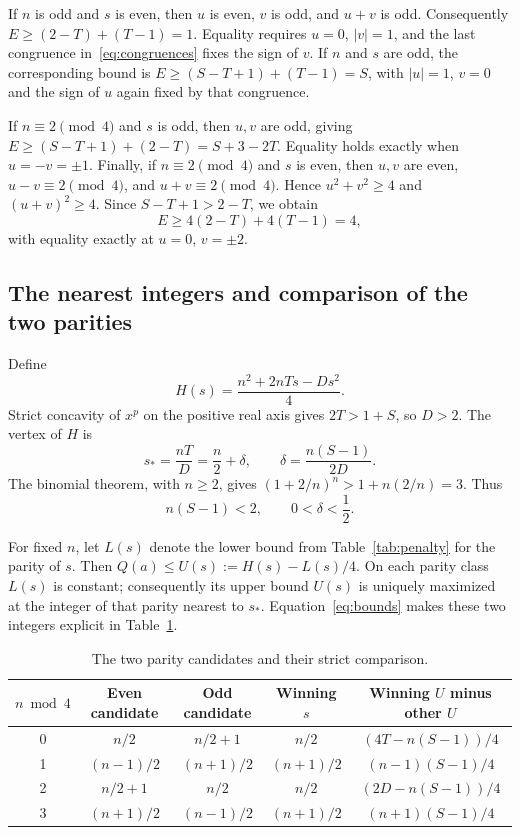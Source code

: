 \documentclass[11pt]{article}
\begin{document}
If $n$ is odd and $s$ is even, then $u$ is even, $v$ is odd, and $u+v$
is odd. Consequently $E\geq(2-T)+(T-1)=1$. Equality requires
$u=0$, $|v|=1$, and the last congruence in~\eqref{eq:congruences}
fixes the sign of $v$. If $n$ and $s$ are odd, the corresponding bound is
$E\geq(S-T+1)+(T-1)=S$, with $|u|=1$, $v=0$ and the sign of $u$
again fixed by that congruence.

If $n\equiv2\pmod4$ and $s$ is odd, then $u,v$ are odd, giving
$E\geq(S-T+1)+(2-T)=S+3-2T$. Equality holds exactly when
$u=-v=\pm1$. Finally, if $n\equiv2\pmod4$ and $s$ is even,
then $u,v$ are even, $u-v\equiv2\pmod4$, and $u+v\equiv2\pmod4$.
Hence $u^2+v^2\geq4$ and $(u+v)^2\geq4$. Since
$S-T+1>2-T$, we obtain
\[
 E\geq4(2-T)+4(T-1)=4,
\]
with equality exactly at $u=0$, $v=\pm2$.

\subsection{The nearest integers and comparison of the two parities}

Define
\[
 H(s)=\frac{n^2+2nTs-Ds^2}{4}.
\]
Strict concavity of $x^p$ on the positive real axis gives
$2T>1+S$, so $D>2$. The vertex of $H$ is
\begin{equation}\label{eq:vertex}
 s_* = \frac{nT}{D}=\frac n2+\delta,
 \qquad \delta=\frac{n(S-1)}{2D}.
\end{equation}
The binomial theorem, with $n\geq2$, gives
$(1+2/n)^n>1+n(2/n)=3$. Thus
\begin{equation}\label{eq:bounds}
 n(S-1)<2,\qquad 0<\delta<\frac12.
\end{equation}

For fixed $n$, let $L(s)$ denote the lower bound from
Table~\ref{tab:penalty} for the parity of $s$. Then
$Q(a)\leq U(s):=H(s)-L(s)/4$.
On each parity class $L(s)$ is constant; consequently its upper bound
$U(s)$ is uniquely maximized at the integer of that parity nearest to
$s_*$. Equation~\eqref{eq:bounds} makes these two integers explicit in
Table~\ref{tab:comparison}.
\begin{table}[ht]
\centering
\begin{tabular}{ccccc}
\toprule
$n\bmod4$ & Even candidate & Odd candidate & Winning $s$ & Winning $U$ minus other $U$\\
\midrule
0 & $n/2$ & $n/2+1$ & $n/2$ & $(4T-n(S-1))/4$\\
1 & $(n-1)/2$ & $(n+1)/2$ & $(n+1)/2$ & $(n-1)(S-1)/4$\\
2 & $n/2+1$ & $n/2$ & $n/2$ & $(2D-n(S-1))/4$\\
3 & $(n+1)/2$ & $(n-1)/2$ & $(n+1)/2$ & $(n+1)(S-1)/4$\\
\bottomrule
\end{tabular}
\caption{The two parity candidates and their strict comparison.}
\label{tab:comparison}
\end{table}
\end{document}
